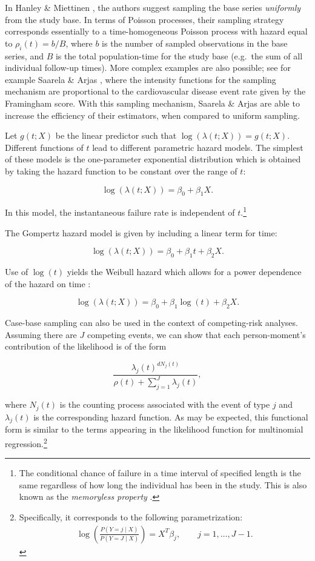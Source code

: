 \documentclass[
]{jss}
\begin{document}
In Hanley \& Miettinen \citeyearpar{hanley2009fitting}, the authors
suggest sampling the base series \emph{uniformly} from the study base.
In terms of Poisson processes, their sampling strategy corresponds
essentially to a time-homogeneous Poisson process with hazard equal to
\(\rho_i(t) = b/B\), where \(b\) is the number of sampled observations
in the base series, and \(B\) is the total population-time for the study
base (e.g.~the sum of all individual follow-up times). More complex
examples are also possible; see for example Saarela \& Arjas
\citeyearpar{saarela2015non}, where the intensity functions for the
sampling mechanism are proportional to the cardiovascular disease event
rate given by the Framingham score. With this sampling mechanism,
Saarela \& Arjas are able to increase the efficiency of their
estimators, when compared to uniform sampling.

Let \(g(t; X)\) be the linear predictor such that
\(\log(\lambda(t;X)) = g(t; X)\). Different functions of \(t\) lead to
different parametric hazard models. The simplest of these models is the
one-parameter exponential distribution which is obtained by taking the
hazard function to be constant over the range of \(t\):

\[ \log(\lambda(t; X)) = \beta_0 + \beta_1 X.\]

In this model, the instantaneous failure rate is independent of
\(t\).\footnote{The conditional chance of failure in a time interval of specified length is the same regardless of how long the individual has been in the study. This is also known as the \textit{memoryless property} \citep{kalbfleisch2011statistical}.}

The Gompertz hazard model is given by including a linear term for time:

\[ \log(\lambda(t; X)) = \beta_0 + \beta_1 t + \beta_2 X.\]

Use of \(\log(t)\) yields the Weibull hazard which allows for a power
dependence of the hazard on time \citep{kalbfleisch2011statistical}:

\[ \log(\lambda(t; X)) = \beta_0 + \beta_1 \log(t) + \beta_2 X. \]

Case-base sampling can also be used in the context of competing-risk
analyses. Assuming there are \(J\) competing events, we can show that
each person-moment's contribution of the likelihood is of the form

\[\frac{\lambda_j(t)^{dN_j(t)}}{\rho(t) + \sum_{j=1}^J\lambda_j(t)},\]

where \(N_j(t)\) is the counting process associated with the event of
type \(j\) and \(\lambda_j(t)\) is the corresponding hazard function. As
may be expected, this functional form is similar to the terms appearing
in the likelihood function for multinomial
regression.\footnote{Specifically, it corresponds to the following parametrization: \begin{align*} \log\left(\frac{P(Y=j \mid X)}{P(Y = J \mid X)}\right) = X^T\beta_j, \qquad j = 1,\ldots, J-1.\end{align*}}
\end{document}
